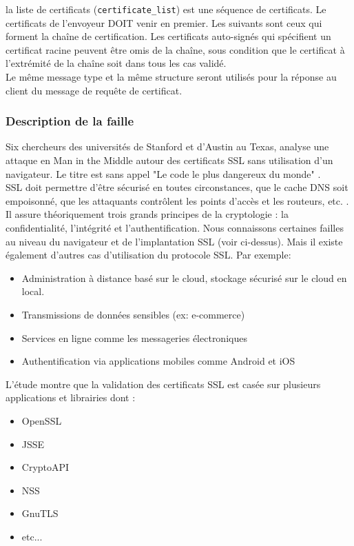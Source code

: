 la liste de certificats (\texttt{certificate\_list}) est une séquence de certificats. Le certificats de l'envoyeur DOIT venir en premier. Les suivants sont ceux qui forment la chaîne de certification. Les certificats auto-signés qui spécifient un certificat racine peuvent être omis de la chaîne, sous condition que le certificat à l'extrémité de la chaîne soit dans tous les cas validé.\\

Le même message type et la même structure seront utilisés pour la réponse au client du message de requête de certificat.


\subsubsection{Description de la faille}

Six chercheurs des universités de Stanford et d'Austin au Texas, analyse une attaque en Man in the Middle autour des certificats SSL sans utilisation d'un navigateur. Le titre est sans appel "Le code le plus dangereux du monde" \cite{validate2012martin}.\\


SSL doit permettre d'être sécurisé en toutes circonstances, que le cache DNS soit empoisonné, que les attaquants contrôlent les points d'accès et les routeurs, etc. . Il assure théoriquement trois grands principes de la cryptologie : la confidentialité, l'intégrité et l'authentification. Nous connaissons certaines failles au niveau du navigateur et de l'implantation SSL (voir ci-dessus). Mais il existe également d'autres cas d'utilisation du protocole SSL. Par exemple:
\begin{itemize}
\item Administration à distance basé sur le cloud, stockage sécurisé sur le cloud en local.
\item Transmissions de données sensibles (ex: e-commerce)
\item Services en ligne comme les messageries électroniques
\item Authentification via applications mobiles comme Android et iOS\\
\end{itemize}

L'étude montre que la validation des certificats SSL est casée sur plusieurs applications et librairies dont :
\begin{itemize}
\item OpenSSL
\item JSSE
\item CryptoAPI
\item NSS
\item GnuTLS
\item etc...\\
\end{itemize}

